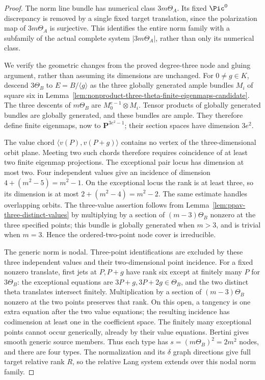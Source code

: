 \begin{proof}
The norm line bundle has numerical class $3m\Theta_A$.
Its fixed $\Pic^0$ discrepancy is removed by a single fixed target
translation, since the polarization map of $3m\Theta_A$ is
surjective.  This identifies the entire norm family with a subfamily
of the actual complete system $|3m\Theta_A|$, rather than only
its numerical class.

We verify the geometric changes from the proved degree-three
node and gluing argument, rather than assuming its dimensions
are unchanged.  For $0\ne g\in K$, descend $3\Theta_B$ to
$E=B/\langle g\rangle$ as the three globally generated ample
bundles $M_i$ of square six in
Lemma~\ref{lem:nonproduct-three-theta-finite-eigenmaps-candidate}.
The three descents of $m\Theta_B$ are
$M_0^{e-1}\otimes M_i$.  Tensor products of globally generated
bundles are globally generated, and these bundles are ample.
They therefore define finite eigenmaps, now to
$\mathbf P^{3e^2-1}$; their section spaces have dimension $3e^2$.

The value chord $\langle v(P),v(P+g)\rangle$ contains no vertex
of the three-dimensional orbit plane.  Meeting two such chords
therefore requires coincidence of at least two finite eigenmap
projections.  The exceptional pair locus has dimension at most
two.  Four independent values give an incidence of dimension
$4+(m^2-5)=m^2-1$.  On the exceptional locus the rank is at
least three, so its dimension is at most
$2+(m^2-4)=m^2-2$.  The same estimate handles overlapping
orbits.  The three-value assertion follows from
Lemma~\ref{lem:ppav-three-distinct-values} by multiplying by a
section of $(m-3)\Theta_B$ nonzero at the three specified points;
this bundle is globally generated when $m>3$, and is trivial
when $m=3$.  Hence the ordered-two-point node cover is irreducible.

The generic norm is nodal.  Three-point identifications are
excluded by these three independent values and their two-dimensional
point incidence.  For a fixed nonzero translate, first jets at
$P,P+g$ have rank six except at finitely many $P$ for $3\Theta_B$:
the exceptional equations are $3P+g,3P+2g\in\Theta_B$, and the
two distinct theta translates intersect finitely.  Multiplication
by a section of $(m-3)\Theta_B$ nonzero at the two points preserves
that rank.  On this open, a tangency is one extra equation after
the two value equations; the resulting incidence has codimension
at least one in the coefficient space.  The finitely many exceptional
points cannot occur generically, already by their value equations.
Bertini gives smooth generic source members.  Thus each type has
$s=(m\Theta_B)^2=2m^2$ nodes, and there are four types.
The normalization and its $\delta$ graph directions give full
target relative rank $R$, so the relative Lang system extends
over this nodal norm family.


\end{proof}
